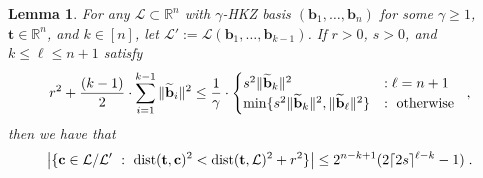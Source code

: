 \documentclass[11pt]{article}
\newtheorem{lemma}[theorem]{Lemma}
\newcommand{\R}{\ensuremath{\mathbb{R}}}
\renewcommand{\vec}[1]{\ensuremath{\mathbf{#1}}}
\newcommand{\lat}{\mathcal{L}}
\newcommand{\gs}[1]{\ensuremath{\widetilde{#1}}}
\DeclareMathOperator{\dist}{dist}
\DeclarePairedDelimiter\set{\{}{\}}
\DeclarePairedDelimiter\ceil{\lceil}{\rceil}
\begin{document}
\begin{lemma} 
\label{lem:sparse-proj-remix}
For any $\lat \subset \R^n$ with $\gamma$-HKZ basis $(\vec{b}_1, \ldots, \vec{b}_n)$ for some $\gamma \geq 1$, $\vec{t} \in \R^n$, and $k \in [n]$, let $\lat' := \lat(\vec{b}_1,\ldots, \vec{b}_{k-1})$. If $r > 0$, $s>0$, and $k \leq \ell \leq n+1$ satisfy 
\begin{equation}
\label{eq:sparse-proj-cond}
r^2 + \frac{(k-1)}{2} \cdot \sum_{i=1}^{k-1}\|\gs{\vec{b}}_i\|^2 \leq \frac{1}{\gamma} \cdot \begin{cases} 
s^2\|\gs{\vec{b}}_k\|^2 &:  \ell = n+1 \\ 
\min \set{ s^2 \|\gs{\vec{b}}_k\|^2,
\|\gs{\vec{b}}_\ell\|^2 } &: \text{ otherwise } \end{cases} 
\; ,
\end{equation}
then we have that
\[
\big| \set{ \vec{c} \in \lat/\lat'\ :\ \dist(\vec{t}, \vec{c})^2 < \dist(\vec{t}, \lat)^2 + r^2} \big| \leq 2^{n-k+1}(2\ceil{2 s}^{\ell-k}-1) 
\; .
\]
\end{lemma}
\end{document}
